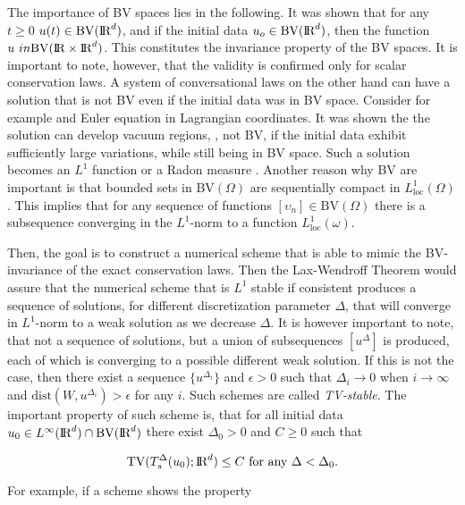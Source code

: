 The importance of BV spaces lies in the following. It was shown \citep{Conway:1966} that for any $t\geq 0$ $u(t)\in \text{BV}(\text{I\!R}^d)$, and if the initial data $u_o\in \text{BV}(\text{I\!R}^d)$, then the function $u \ in \text{BV}(\text{I\!R}\times\text{I\!R}^d)$. This constitutes the invariance property of the BV spaces. It is important to note, however, that the validity is confirmed only for scalar conservation laws. A system of conversational laws on the other hand can have a solution that is not BV even if the initial data was in BV space. Consider for example and Euler equation in Lagrangian coordinates. It was shown the the solution can develop vacuum regions, \ie, not BV, if the initial data exhibit sufficiently large variations, while still being in BV space.  Such a solution becomes an $L^1$ function or a Radon measure \citep{Chen:2006}. Another reason why BV are important is that bounded sets in BV$(\Omega)$ are sequentially compact in $L^1 _{\text{loc}}(\Omega)$ \citep[\eg][]{Luigi:2002}. This implies that for any sequence of functions $[\upsilon_n]\in\text{BV}(\Omega)$ there is a subsequence converging in the $L^1$-norm to a function $L^1 _{\text{loc}}(\omega)$. 

Then, the goal is to construct a numerical scheme that is able to mimic the BV-invariance of the exact conservation laws. Then the Lax-Wendroff Theorem would assure that the numerical scheme that is $L^1$ stable if consistent produces a sequence of solutions, for different discretization parameter $\Delta$, that will converge in $L^1$-norm to a weak solution as we decrease $\Delta$. It is however important to note, that not a sequence of solutions, but a union of subsequences $[u^{\Delta}]$ is produced, each of which is converging to a possible different weak solution. If this is not the case, then there exist a sequence $\{u^{\Delta_i}\}$ and $\epsilon > 0$ such that $\Delta_i\rightarrow 0 $ when $i\rightarrow \infty$ and $\text{dist}(W,u^{\Delta_i})>\epsilon$ for any $i$. Such schemes are called \textit{TV-stable}. The important property of such scheme is, that for all initial data $u_0\in L^{\infty}(\text{I\!R}^d)\cap \text{BV}(\text{I\!R}^d)$ there exist $\Delta_0 > 0$ and $C\geq 0$ such that 

\begin{equation}
\text{TV}(T_s ^{\Delta}(u_0); \text{I\!R}^d)\leq C \text{ for any } \Delta < \Delta_0.
\end{equation}

For example, if a scheme shows the property 

